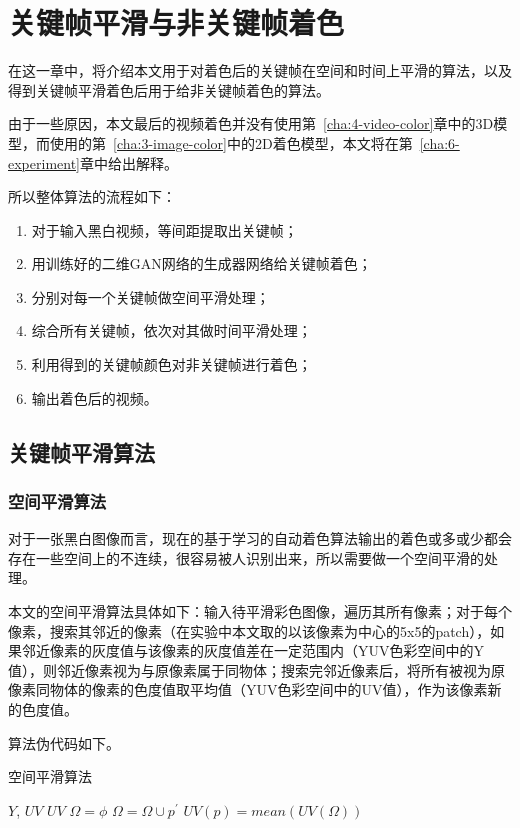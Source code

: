 \chapter{关键帧平滑与非关键帧着色}
\label{cha:5-other-algorithm}

  在这一章中，将介绍本文用于对着色后的关键帧在空间和时间上平滑的算法，以及得到关键帧平滑着色后用于给非关键帧着色的算法。

  由于一些原因，本文最后的视频着色并没有使用第~\ref{cha:4-video-color}章中的3D模型，而使用的第~\ref{cha:3-image-color}中的2D着色模型，本文将在第~\ref{cha:6-experiment}章中给出解释。

  所以整体算法的流程如下：

  \begin{enumerate}
    \item 对于输入黑白视频，等间距提取出关键帧；
    \item 用训练好的二维GAN网络的生成器网络给关键帧着色；
    \item 分别对每一个关键帧做空间平滑处理；
    \item 综合所有关键帧，依次对其做时间平滑处理；
    \item 利用得到的关键帧颜色对非关键帧进行着色；
    \item 输出着色后的视频。
  \end{enumerate}

\section{关键帧平滑算法}
\label{sec:5-keyframe-smooth}

\subsection{空间平滑算法}
\label{sec:5-spatial-smooth}

  对于一张黑白图像而言，现在的基于学习的自动着色算法输出的着色或多或少都会存在一些空间上的不连续，很容易被人识别出来，所以需要做一个空间平滑的处理。

  本文的空间平滑算法具体如下：输入待平滑彩色图像，遍历其所有像素；对于每个像素，搜索其邻近的像素（在实验中本文取的以该像素为中心的5x5的patch），如果邻近像素的灰度值与该像素的灰度值差在一定范围内（YUV色彩空间中的Y值），则邻近像素视为与原像素属于同物体；搜索完邻近像素后，将所有被视为原像素同物体的像素的色度值取平均值（YUV色彩空间中的UV值），作为该像素新的色度值。

  算法伪代码如下。

  \begin{algorithm}[H]
  \label{algo:5-spatial-smooth}
    \caption*{空间平滑算法}
    \begin{algorithmic}[1]
      \Require $Y$, $UV$
      \Ensure  $UV$
          \State $\Omega = \phi$
              \State $\Omega = \Omega \cup p^{'}$
            \EndIf
          \EndFor
          \State $UV(p) = mean(UV(\Omega))$
        \EndFor
      \EndFunction
    \end{algorithmic}
  \end{algorithm}


